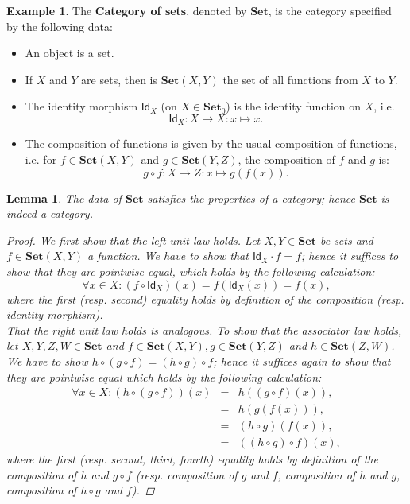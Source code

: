 \documentclass[a4paper,10pt]{scrartcl}
\theoremstyle{plain}
\newtheorem{lemma}[thm]{Lemma}
\theoremstyle{definition}
\newtheorem{exa}[thm]{Example}
\newcommand{\cfont}[1]{\ensuremath{\mathsf{#1}}}
\newcommand{\Catb}[1]{\mathbf{#1}}
\newcommand{\SET}{\Catb{Set}}
\newcommand{\Ob}[1]{{#1}_0}
\newcommand{\CHom}[3]{{#1}(#2,#3)}
\newcommand{\Id}[1][]{\cfont{Id}_{#1}}
\newcommand{\Comp}{\cdot}
\begin{document}
\begin{exa}\label{example:set} The \textbf{Category of sets}, denoted by $\SET$, is the category specified by the following data:
\begin{itemize}
\item An object is a set.
\item If $X$ and $Y$ are sets, then is $\CHom \SET X Y$ the set of all functions from $X$ to $Y$.
\item The identity morphism $\Id[X]$ (on $X\in\Ob{\SET}$) is the identity function on $X$, i.e.
\[
\Id[X] : X\to X: x \mapsto x.
\]
\item The composition of functions is given by the usual composition of functions, i.e. for $f\in \CHom \SET X Y$ and $g\in \CHom \SET Y Z$, the composition of $f$ and $g$ is:
$$g \circ f : X\to Z: x\mapsto g(f(x)).$$
\end{itemize}
\end{exa}
\begin{lemma} The data of $\SET$ satisfies the properties of a category; hence $\SET$ is indeed a category.
\begin{proof}
We first show that the left unit law holds. Let $X,Y\in \mathbf{Set}$ be sets and $f\in \CHom \SET X Y$ a function. We have to show that $\Id[X] \Comp f = f$; hence it suffices to show that they are pointwise equal, which holds by the following calculation:
\[
\forall x\in X: (f\circ \Id[X])(x) = f\left(\Id[X](x)\right) = f(x),
\]
where the first (resp. second) equality holds by definition of the composition (resp. identity morphism).\\
That the right unit law holds is analogous. To show that the associator law holds, let $X,Y,Z,W\in\mathbf{Set}$ and $f\in \CHom \SET X Y, g\in \CHom \SET Y Z$ and $h\in \CHom \SET Z W$. We have to show $h\circ (g\circ f) = (h\circ g)\circ f$; hence it suffices again to show that they are pointwise equal which holds by the following calculation:
\begin{eqnarray*}
\forall x\in X: \left(h\circ (g\circ f)\right)(x) &=& h\left((g\circ f)(x)\right), \\ 
	&=& h(g(f(x))),\\ 
	&=& (h\circ g)(f(x)),\\ 
	&=& \left((h\circ g)\circ f\right)(x),
\end{eqnarray*}
where the first (resp. second, third, fourth) equality holds by definition of the composition of $h$ and $g\circ f$ (resp. composition of $g$ and $f$, composition of $h$ and $g$, composition of $h\circ g$ and $f$).
\end{proof}
\end{lemma}
\end{document}
